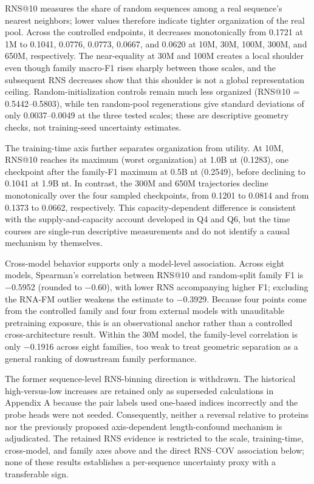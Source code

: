 RNS@10 measures the share of random sequences among a real sequence's nearest neighbors; lower values therefore indicate tighter organization of the real pool. Across the controlled endpoints, it decreases monotonically from 0.1721 at 1M to 0.1041, 0.0776, 0.0773, 0.0667, and 0.0620 at 10M, 30M, 100M, 300M, and 650M, respectively. The near-equality at 30M and 100M creates a local shoulder even though family macro-F1 rises sharply between those scales, and the subsequent RNS decreases show that this shoulder is not a global representation ceiling. Random-initialization controls remain much less organized (RNS@10 = 0.5442--0.5803), while ten random-pool regenerations give standard deviations of only 0.0037--0.0049 at the three tested scales; these are descriptive geometry checks, not training-seed uncertainty estimates.

The training-time axis further separates organization from utility. At 10M, RNS@10 reaches its maximum (worst organization) at 1.0B nt (0.1283), one checkpoint after the family-F1 maximum at 0.5B nt (0.2549), before declining to 0.1041 at 1.9B nt. In contrast, the 300M and 650M trajectories decline monotonically over the four sampled checkpoints, from 0.1201 to 0.0814 and from 0.1373 to 0.0662, respectively. This capacity-dependent difference is consistent with the supply-and-capacity account developed in Q4 and Q6, but the time courses are single-run descriptive measurements and do not identify a causal mechanism by themselves.

Cross-model behavior supports only a model-level association. Across eight models, Spearman's correlation between RNS@10 and random-split family F1 is \(-\)0.5952 (rounded to \(-\)0.60), with lower RNS accompanying higher F1; excluding the RNA-FM outlier weakens the estimate to \(-\)0.3929. Because four points come from the controlled family and four from external models with unauditable pretraining exposure, this is an observational anchor rather than a controlled cross-architecture result. Within the 30M model, the family-level correlation is only \(-\)0.1916 across eight families, too weak to treat geometric separation as a general ranking of downstream family performance.

The former sequence-level RNS-binning direction is withdrawn. The historical high-versus-low increases are retained only as superseded calculations in Appendix A because the pair labels used one-based indices incorrectly and the probe heads were not seeded. Consequently, neither a reversal relative to proteins nor the previously proposed axis-dependent length-confound mechanism is adjudicated. The retained RNS evidence is restricted to the scale, training-time, cross-model, and family axes above and the direct RNS--COV association below; none of these results establishes a per-sequence uncertainty proxy with a transferable sign.

